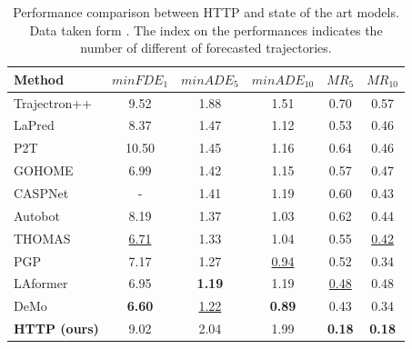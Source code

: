 \documentclass[conference]{IEEEtran}
\begin{document}
\begin{table}[t]
    \centering
    \caption{Performance comparison between HTTP and state of the art models. Data taken form \cite{zhang2024demodecouplingmotionforecasting}. The index on the performances indicates the number of different of forecasted trajectories.}
    \label{tab:performance_comparison}
    \begin{tabular}{l|ccccc}
    \toprule
    \textbf{Method} & $minFDE_1$ & $minADE_5$ & $minADE_{10}$ & $MR_5$ & $MR_{10}$ \\ 
    \midrule
    Trajectron++ & 9.52 & 1.88 & 1.51 & 0.70 & 0.57 \\
    LaPred       & 8.37 & 1.47 & 1.12 & 0.53 & 0.46 \\
    P2T          & 10.50 & 1.45 & 1.16 & 0.64 & 0.46 \\
    GOHOME       & 6.99 & 1.42 & 1.15 & 0.57 & 0.47 \\
    CASPNet      & -    & 1.41 & 1.19 & 0.60 & 0.43 \\
    Autobot      & 8.19 & 1.37 & 1.03 & 0.62 & 0.44 \\
    THOMAS       & \underline{6.71} & 1.33 & 1.04 & 0.55 & \underline{0.42} \\
    PGP          & 7.17 & 1.27 & \underline{0.94} & 0.52 & 0.34 \\
    LAformer     & 6.95 & \textbf{1.19} & 1.19 & \underline{0.48} & 0.48 \\ 
    DeMo         & \textbf{6.60} & \underline{1.22} & \textbf{0.89} & 0.43 & 0.34 \\
    \midrule
    \textbf{HTTP (ours)} & 9.02 & 2.04 & 1.99 & \textbf{0.18} & \textbf{0.18} \\
    \bottomrule
    \end{tabular}
\end{table}
\end{document}
